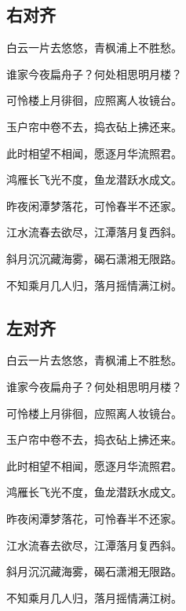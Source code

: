 \documentclass{article}
\begin{document}
\subsection{右对齐}

\begin{flushright}

白云一片去悠悠，青枫浦上不胜愁。

谁家今夜扁舟子？何处相思明月楼？

可怜楼上月徘徊，应照离人妆镜台。

玉户帘中卷不去，捣衣砧上拂还来。

此时相望不相闻，愿逐月华流照君。

鸿雁长飞光不度，鱼龙潜跃水成文。

昨夜闲潭梦落花，可怜春半不还家。

江水流春去欲尽，江潭落月复西斜。

斜月沉沉藏海雾，碣石潇湘无限路。

不知乘月几人归，落月摇情满江树。

\end{flushright}

\subsection{左对齐}

\begin{flushleft}

白云一片去悠悠，青枫浦上不胜愁。

谁家今夜扁舟子？何处相思明月楼？

可怜楼上月徘徊，应照离人妆镜台。

玉户帘中卷不去，捣衣砧上拂还来。

此时相望不相闻，愿逐月华流照君。

鸿雁长飞光不度，鱼龙潜跃水成文。

昨夜闲潭梦落花，可怜春半不还家。

江水流春去欲尽，江潭落月复西斜。

斜月沉沉藏海雾，碣石潇湘无限路。

不知乘月几人归，落月摇情满江树。

\end{flushleft}


\end{document}
